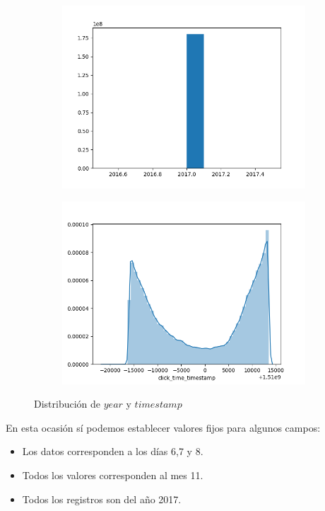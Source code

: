 \begin{figure}[H]
	\centering
	\begin{subfigure}{.5\textwidth}
		\centering
\includegraphics[scale=0.5]{img/click_time_year_distribution.png}
	\end{subfigure}%
	\begin{subfigure}{.5\textwidth}
		\centering
\includegraphics[scale=0.5]{img/normalDistclick_time_timestamp.png}
		
	\end{subfigure}
	\caption{Distribución de $year$ y $timestamp$}

\end{figure}

En esta ocasión sí podemos establecer valores fijos para algunos campos:
\begin{itemize}
	\item Los datos corresponden a los días 6,7 y 8.
	\item Todos los valores corresponden al mes 11.
	\item Todos los registros son del año 2017.
\end{itemize}


